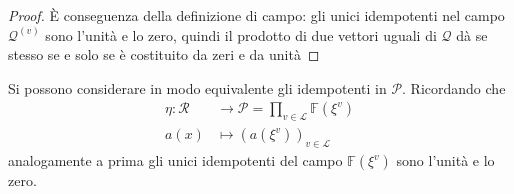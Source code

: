 \begin{proof}
   È conseguenza della definizione di campo: gli unici idempotenti nel campo $\mathcal{Q}^{(v)}$ sono l'unità e lo zero, quindi il prodotto di due vettori uguali di $\mathcal{Q}$ dà se stesso se e solo se è costituito da zeri e da unità
\end{proof}
\noindent
\begin{osservazione}
   Si possono considerare in modo equivalente gli idempotenti in $\mathcal{P}$. Ricordando che
   \begin{align*}
      \eta:  \mathcal{R} &\longrightarrow \mathcal{P} =  \prod_{v\in \mathscr{L}} \mathbb{F}(\xi^{v}) \\
	a(x) &\longmapsto  (a(\xi^{v}))_{v\in \mathscr{L}}
    \end{align*}
    analogamente a prima gli unici idempotenti del campo $\mathbb{F}(\xi^{v})$ sono l'unità e lo zero.
\end{osservazione}

